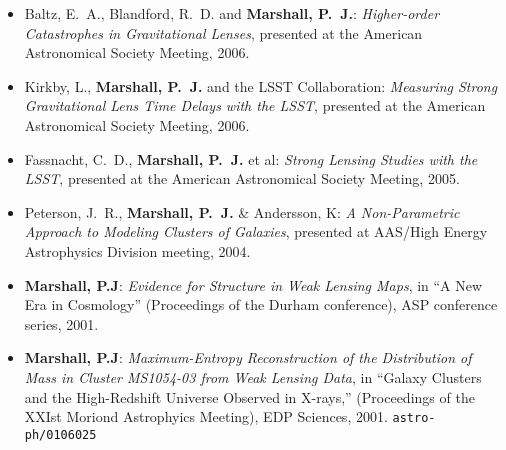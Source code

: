 \begin{itemize}
\item{{Baltz}, E.~A., {Blandford}, R.~D. and \textbf{Marshall, P.~J.}:
\textit{Higher-order Catastrophes in Gravitational Lenses},
presented at the {American Astronomical Society Meeting}, 2006.
}

\item{{Kirkby}, L., \textbf{Marshall, P.~J.} and the {LSST Collaboration}:
\textit{Measuring Strong Gravitational Lens Time Delays with the LSST},
presented at the {American Astronomical Society Meeting}, 2006.
}

\item{{Fassnacht}, C.~D., \textbf{{Marshall}, P.~J.} et al:
\textit{Strong Lensing Studies with the LSST},
presented at the {American Astronomical Society Meeting}, 2005.
}

\item{{Peterson}, J.~R., \textbf{{Marshall}, P.~J.} \& {Andersson}, K:
\textit{A Non-Parametric Approach to Modeling Clusters of Galaxies},
presented at {AAS/High Energy Astrophysics Division} meeting, 2004.
}

\item{\textbf{Marshall, P.J}:
\textit{Evidence for Structure in Weak Lensing Maps},
in ``A New Era in Cosmology'' (Proceedings of the Durham conference), ASP conference series, 2001.
}

\item{\textbf{Marshall, P.J}:
\textit{Maximum-Entropy Reconstruction of the Distribution of Mass in Cluster MS1054-03 from Weak Lensing Data},
in ``Galaxy Clusters and the High-Redshift Universe Observed in X-rays,''
(Proceedings of the XXIst Moriond Astrophyics Meeting), EDP Sciences, 2001.
\texttt{astro-ph/0106025}
}
\end{itemize}

